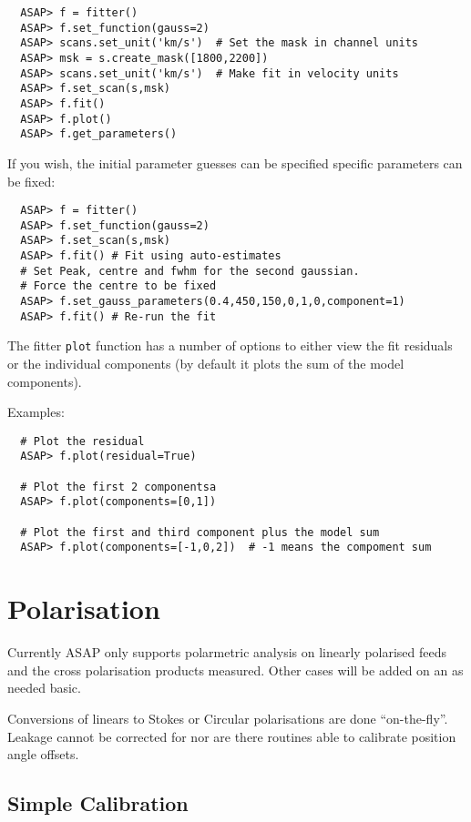 \documentclass[11pt]{article}
\newcommand{\cmd}[1]{{\tt #1}}
\begin{document}
\begin{verbatim}
  ASAP> f = fitter()
  ASAP> f.set_function(gauss=2)
  ASAP> scans.set_unit('km/s')  # Set the mask in channel units
  ASAP> msk = s.create_mask([1800,2200])
  ASAP> scans.set_unit('km/s')  # Make fit in velocity units
  ASAP> f.set_scan(s,msk)
  ASAP> f.fit()
  ASAP> f.plot()
  ASAP> f.get_parameters()
\end{verbatim}

If you wish, the initial parameter guesses can be specified specific
parameters can be fixed:

\begin{verbatim}
  ASAP> f = fitter()
  ASAP> f.set_function(gauss=2)
  ASAP> f.set_scan(s,msk)
  ASAP> f.fit() # Fit using auto-estimates
  # Set Peak, centre and fwhm for the second gaussian. 
  # Force the centre to be fixed
  ASAP> f.set_gauss_parameters(0.4,450,150,0,1,0,component=1)
  ASAP> f.fit() # Re-run the fit
\end{verbatim}

The fitter \cmd{plot} function has a number of options to either view
the fit residuals or the individual components (by default it plots
the sum of the model components).

Examples:

\begin{verbatim}
  # Plot the residual
  ASAP> f.plot(residual=True) 

  # Plot the first 2 componentsa
  ASAP> f.plot(components=[0,1]) 

  # Plot the first and third component plus the model sum
  ASAP> f.plot(components=[-1,0,2])  # -1 means the compoment sum
\end{verbatim}

\section{Polarisation}

Currently ASAP only supports polarmetric analysis on linearly
polarised feeds and the cross polarisation products measured. Other
cases will be added on an as needed basic.

Conversions of linears to Stokes or Circular polarisations are done
``on-the-fly''. Leakage cannot be corrected for nor are there routines
able to calibrate position angle offsets. 

\subsection{Simple Calibration}
\end{document}
